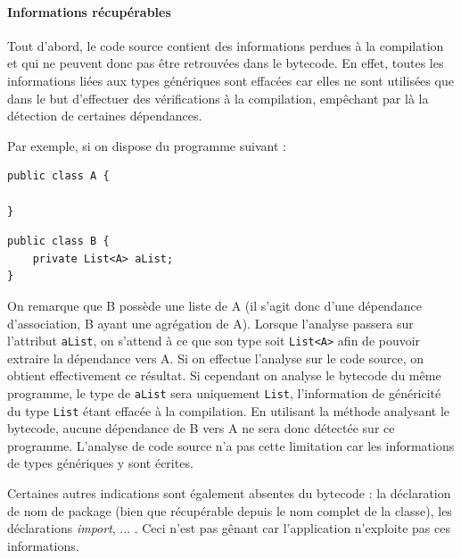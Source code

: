 \documentclass{scrartcl}
\begin{document}
    \paragraph{Informations récupérables} Tout d'abord, le code source contient des informations perdues à la compilation et qui ne peuvent donc pas être retrouvées dans le bytecode. En effet, toutes les informations liées aux types génériques sont effacées car elles ne sont utilisées que dans le but d'effectuer des vérifications à la compilation, empêchant par là la détection de certaines dépendances.
    
    Par exemple, si on dispose du programme suivant :
    
    \begin{minipage}{(\textwidth/2) - 0.6cm}
        \begin{lstlisting}
public class A {

}
        \end{lstlisting}
    \end{minipage}
    \hspace{0.5cm}
    \begin{minipage}{(\textwidth/2) - 0.6cm}
        \begin{lstlisting}
public class B {
    private List<A> aList;
}
        \end{lstlisting}
    \end{minipage}
    
    On remarque que B possède une liste de A (il s'agit donc d'une dépendance d'association, B ayant une agrégation de A). Lorsque l'analyse passera sur l'attribut \texttt{aList}, on s'attend à ce que son type soit \texttt{List<A>} afin de pouvoir extraire la dépendance vers A. Si on effectue l'analyse sur le code source, on obtient effectivement ce résultat. Si cependant on analyse le bytecode du même programme, le type de \texttt{aList} sera uniquement \texttt{List}, l'information de généricité du type \texttt{List} étant effacée à la compilation. En utilisant la méthode analysant le bytecode, aucune dépendance de B vers A ne sera donc détectée sur ce programme. L'analyse de code source n'a pas cette limitation car les informations de types génériques y sont écrites.
    
    Certaines autres indications sont également absentes du bytecode : la déclaration de nom de package (bien que récupérable depuis le nom complet de la classe), les déclarations \textit{import}, ... . Ceci n'est pas gênant car l'application n'exploite pas ces informations.
    
\end{document}

